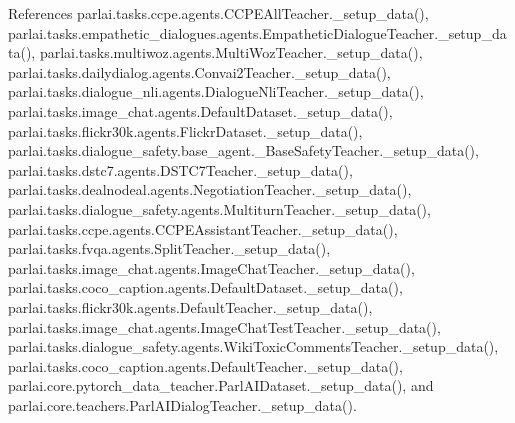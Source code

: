 References parlai.\+tasks.\+ccpe.\+agents.\+C\+C\+P\+E\+All\+Teacher.\+\_\+setup\+\_\+data(), parlai.\+tasks.\+empathetic\+\_\+dialogues.\+agents.\+Empathetic\+Dialogue\+Teacher.\+\_\+setup\+\_\+data(), parlai.\+tasks.\+multiwoz.\+agents.\+Multi\+Woz\+Teacher.\+\_\+setup\+\_\+data(), parlai.\+tasks.\+dailydialog.\+agents.\+Convai2\+Teacher.\+\_\+setup\+\_\+data(), parlai.\+tasks.\+dialogue\+\_\+nli.\+agents.\+Dialogue\+Nli\+Teacher.\+\_\+setup\+\_\+data(), parlai.\+tasks.\+image\+\_\+chat.\+agents.\+Default\+Dataset.\+\_\+setup\+\_\+data(), parlai.\+tasks.\+flickr30k.\+agents.\+Flickr\+Dataset.\+\_\+setup\+\_\+data(), parlai.\+tasks.\+dialogue\+\_\+safety.\+base\+\_\+agent.\+\_\+\+Base\+Safety\+Teacher.\+\_\+setup\+\_\+data(), parlai.\+tasks.\+dstc7.\+agents.\+D\+S\+T\+C7\+Teacher.\+\_\+setup\+\_\+data(), parlai.\+tasks.\+dealnodeal.\+agents.\+Negotiation\+Teacher.\+\_\+setup\+\_\+data(), parlai.\+tasks.\+dialogue\+\_\+safety.\+agents.\+Multiturn\+Teacher.\+\_\+setup\+\_\+data(), parlai.\+tasks.\+ccpe.\+agents.\+C\+C\+P\+E\+Assistant\+Teacher.\+\_\+setup\+\_\+data(), parlai.\+tasks.\+fvqa.\+agents.\+Split\+Teacher.\+\_\+setup\+\_\+data(), parlai.\+tasks.\+image\+\_\+chat.\+agents.\+Image\+Chat\+Teacher.\+\_\+setup\+\_\+data(), parlai.\+tasks.\+coco\+\_\+caption.\+agents.\+Default\+Dataset.\+\_\+setup\+\_\+data(), parlai.\+tasks.\+flickr30k.\+agents.\+Default\+Teacher.\+\_\+setup\+\_\+data(), parlai.\+tasks.\+image\+\_\+chat.\+agents.\+Image\+Chat\+Test\+Teacher.\+\_\+setup\+\_\+data(), parlai.\+tasks.\+dialogue\+\_\+safety.\+agents.\+Wiki\+Toxic\+Comments\+Teacher.\+\_\+setup\+\_\+data(), parlai.\+tasks.\+coco\+\_\+caption.\+agents.\+Default\+Teacher.\+\_\+setup\+\_\+data(), parlai.\+core.\+pytorch\+\_\+data\+\_\+teacher.\+Parl\+A\+I\+Dataset.\+\_\+setup\+\_\+data(), and parlai.\+core.\+teachers.\+Parl\+A\+I\+Dialog\+Teacher.\+\_\+setup\+\_\+data().

